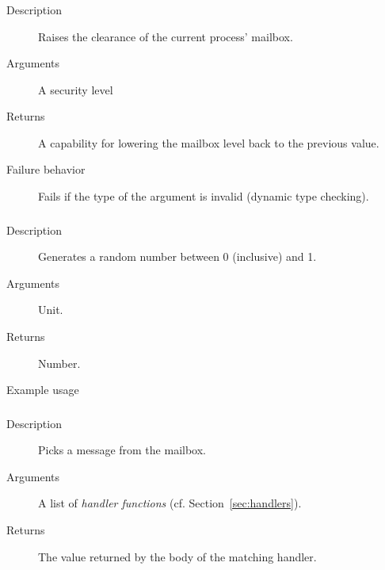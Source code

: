 \subsubsection{}
\begin{description}
    \item [Description] Raises the clearance of the current process' mailbox. 
    \item [Arguments] A security level
    \item [Returns] A capability for lowering the mailbox level back to the previous value. 
    \item [Failure behavior] Fails if the type of the argument is invalid (dynamic type checking).
\end{description}


\subsubsection{}
\begin{description}
    \item [Description] Generates a random number between 0 (inclusive) and 1.
    \item [Arguments] Unit.
    \item [Returns] Number.
    \item [Example usage] 
\end{description}





\subsubsection{}
\begin{description}
    \item [Description] Picks a message from the mailbox.
    \item [Arguments] A list of \emph{handler functions} (cf. Section~\ref{sec:handlers}).
    \item [Returns] The value returned by the body of the matching handler.
\end{description}

